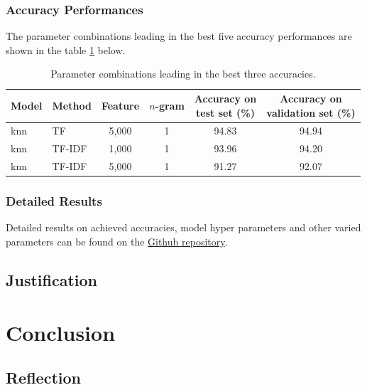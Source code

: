 \documentclass[a4paper,12pt,nottoc]{article}
\begin{document}
\subsubsection{Accuracy Performances}

The parameter combinations leading in the best five accuracy performances are shown in the table \ref{tab:accperf} below.

\begin{table}[h]
\begin{center}
\begin{tabular}{| l | l | c | c | c | c |}
\hline
Model & Method & Feature & $n$-gram & \thead{Accuracy on \\ test set (\%)} & \thead{Accuracy on \\ validation set (\%)} \\
\hline
knn & TF & 5,000 & 1 & 94.83 & 94.94 \\
knn & TF-IDF & 1,000 & 1 & 93.96 & 94.20 \\
knn & TF-IDF & 5,000 & 1 & 91.27 & 92.07	 \\
\hline 
\end{tabular}
\end{center}
\caption{Parameter combinations leading in the best three accuracies.}\label{tab:accperf}
\end{table}

\subsubsection{Detailed Results}

Detailed results on achieved accuracies, model hyper parameters and other varied parameters can be found on the \href{https://github.com/benjaminperucco/udacity-nano-mle/blob/master/5%20Capstone/2%20Project/3_postprocessing.ipynb}{Github repository}. 

\subsection{Justification}




\section{Conclusion}

\subsection{Reflection}\label{chap:reflection}
\end{document}

